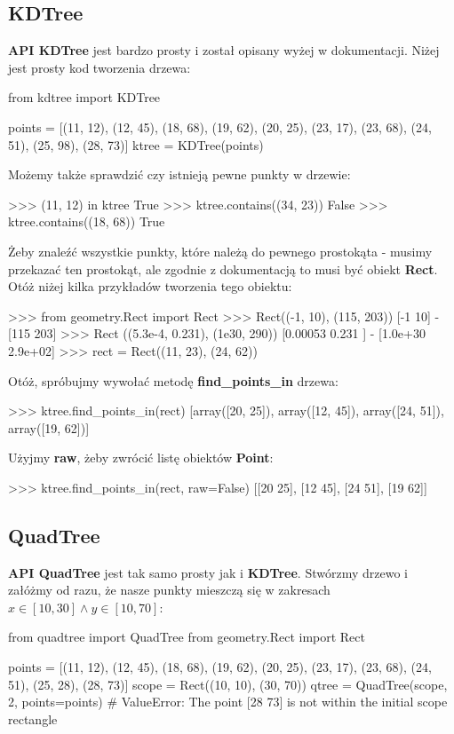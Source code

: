 \documentclass[a4paper, 12pt]{article}
\begin{document}
    \subsection{KDTree}
      \quad \textbf{API KDTree} jest bardzo prosty i został opisany wyżej w dokumentacji. Niżej jest prosty kod tworzenia drzewa:
      \begin{python}
      from kdtree import KDTree

      points = [(11, 12), (12, 45), (18, 68), (19, 62), (20, 25),
                (23, 17), (23, 68), (24, 51), (25, 98), (28, 73)]
      ktree = KDTree(points)
      \end{python}

      \noindent
      \quad Możemy także sprawdzić czy istnieją pewne punkty w drzewie:
      \begin{python}
      >>> (11, 12) in ktree
      True
      >>> ktree.contains((34, 23))
      False
      >>> ktree.contains((18, 68))
      True
      \end{python}

      \noindent
      \quad Żeby znaleźć wszystkie punkty, które należą do pewnego prostokąta - musimy przekazać ten prostokąt, ale zgodnie z dokumentacją to musi być obiekt \textbf{Rect}. Otóż niżej kilka przykładów tworzenia tego obiektu:
      \begin{python}
      >>> from geometry.Rect import Rect
      >>> Rect((-1, 10), (115, 203))
      [-1 10] - [115 203]
      >>> Rect ((5.3e-4, 0.231), (1e30, 290))
      [0.00053 0.231  ] - [1.0e+30 2.9e+02]
      >>> rect = Rect((11, 23), (24, 62))
      \end{python}

      \noindent
      \quad Otóż, spróbujmy wywołać metodę \textbf{find\_points\_in} drzewa:
      \begin{python}
      >>> ktree.find_points_in(rect)
      [array([20, 25]), array([12, 45]), array([24, 51]), array([19, 62])]
      \end{python}

      \noindent
      \quad Użyjmy \textbf{raw}, żeby zwrócić listę obiektów \textbf{Point}:
      \begin{python}
      >>> ktree.find_points_in(rect, raw=False)
      [[20 25], [12 45], [24 51], [19 62]]
      \end{python}

    \subsection{QuadTree}
      \quad \textbf{API QuadTree} jest tak samo prosty jak i \textbf{KDTree}. Stwórzmy drzewo i załóżmy od razu, że nasze punkty mieszczą się w zakresach $x \in [10, 30] \land y \in [10, 70]$:
      \begin{python}
      from quadtree import QuadTree
      from geometry.Rect import Rect

      points = [(11, 12), (12, 45), (18, 68), (19, 62), (20, 25),
                (23, 17), (23, 68), (24, 51), (25, 28), (28, 73)]
      scope = Rect((10, 10), (30, 70))
      qtree = QuadTree(scope, 2, points=points)
      # ValueError: The point [28 73] is not within the initial scope rectangle
      \end{python}
\end{document}
